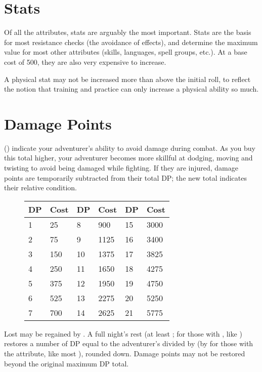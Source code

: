 \vspace{10pt}
\begin{multicols*}{2}
\section{Stats}
Of all the attributes, stats are arguably the most important. Stats are the basis for most resistance checks (the avoidance of effects), and determine the maximum value for most other attributes (skills, languages, spell groups, etc.). At a base cost of 500, they are also very expensive to increase. 

A physical stat may not be increased more than  above the initial roll, to reflect the notion that training and practice can only increase a physical ability so much.
\section{Damage Points}
 (\DP) indicate your adventurer's ability to avoid damage during combat. As you buy this total higher, your adventurer becomes more skillful at dodging, moving and twisting to avoid being damaged while fighting. If they are injured, damage points are temporarily subtracted from their total DP; the new total indicates their relative condition.

\begin{wrapfigure}[11]{o}[0pt]{5.75cm}
\begin{normbox}
\small
\begin{tabular}{l l|l l|l l}
DP & Cost & DP & Cost & DP & Cost\\
\midrule
1 & 25 & 8 & 900 & 15 & 3000\\
2 & 75 & 9 & 1125 & 16 & 3400\\
3 & 150 & 10 & 1375 & 17 & 3825\\
4 & 250 & 11 & 1650 & 18 & 4275\\
5 & 375 & 12 & 1950 & 19 & 4750\\
6 & 525 & 13 & 2275 & 20 & 5250\\
7 & 700 & 14 & 2625 & 21 & 5775\\
\end{tabular}
\end{normbox}
\end{wrapfigure}

Lost \DP may be regained by . A full night's rest (at least ;  for those with , like ) restores a number of DP equal to the adventurer's \HEA divided by  (by  for those with the  attribute, like most ), rounded down. Damage points may not be restored beyond the original maximum DP total.


\end{multicols*}
